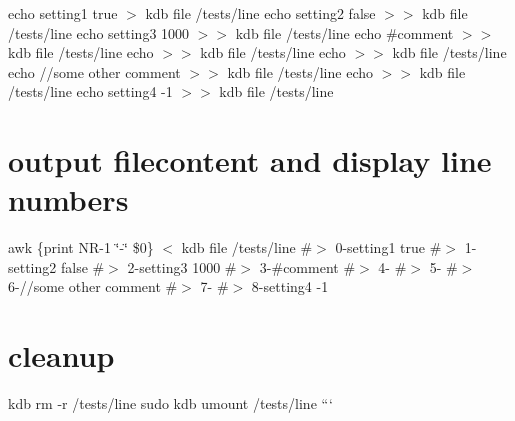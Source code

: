 echo \textquotesingle{}setting1 true\textquotesingle{} $>$ {\ttfamily kdb file /tests/line} echo \textquotesingle{}setting2 false\textquotesingle{} $>$$>$ {\ttfamily kdb file /tests/line} echo \textquotesingle{}setting3 1000\textquotesingle{} $>$$>$ {\ttfamily kdb file /tests/line} echo \textquotesingle{}\#comment\textquotesingle{} $>$$>$ {\ttfamily kdb file /tests/line} echo $>$$>$ {\ttfamily kdb file /tests/line} echo $>$$>$ {\ttfamily kdb file /tests/line} echo \textquotesingle{}//some other comment\textquotesingle{} $>$$>$ {\ttfamily kdb file /tests/line} echo $>$$>$ {\ttfamily kdb file /tests/line} echo \textquotesingle{}setting4 -\/1\textquotesingle{} $>$$>$ {\ttfamily kdb file /tests/line}

\section*{output filecontent and display line numbers}

awk \textquotesingle{}\{print N\+R-\/1 \char`\"{}-\/\char`\"{} \$0\}\textquotesingle{} $<$ {\ttfamily kdb file /tests/line} \#$>$ 0-\/setting1 true \#$>$ 1-\/setting2 false \#$>$ 2-\/setting3 1000 \#$>$ 3-\/\#comment \#$>$ 4-\/ \#$>$ 5-\/ \#$>$ 6-\///some other comment \#$>$ 7-\/ \#$>$ 8-\/setting4 -\/1

\section*{cleanup}

kdb rm -\/r /tests/line sudo kdb umount /tests/line ``` 
